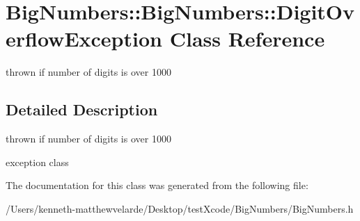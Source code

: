 \hypertarget{class_big_numbers_1_1_big_numbers_1_1_digit_overflow_exception}{}\section{Big\+Numbers\+::Big\+Numbers\+::Digit\+Overflow\+Exception Class Reference}
\label{class_big_numbers_1_1_big_numbers_1_1_digit_overflow_exception}


thrown if number of digits is over 1000  




\subsection{Detailed Description}
thrown if number of digits is over 1000 

exception class 

The documentation for this class was generated from the following file\+:\begin{DoxyCompactItemize}
\item 
/\+Users/kenneth-\/matthewvelarde/\+Desktop/test\+Xcode/\+Big\+Numbers/Big\+Numbers.\+h\end{DoxyCompactItemize}
